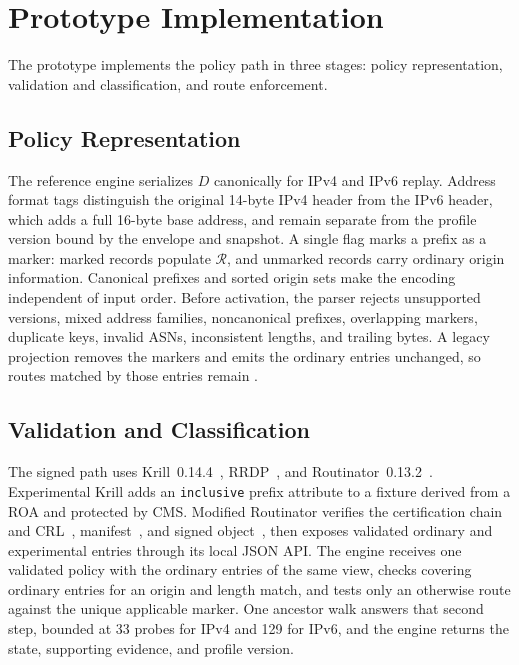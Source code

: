 \section{Prototype Implementation}
\label{sec:implementation}

The prototype implements the policy path in three stages: policy representation, validation and classification, and route enforcement.

\subsection{Policy Representation}
\label{sec:impl-representation}

The reference engine serializes $D$ canonically for IPv4 and IPv6 replay. Address format tags distinguish the original 14-byte IPv4 header from the IPv6 header, which adds a full 16-byte base address, and remain separate from the profile version bound by the envelope and snapshot. A single flag marks a prefix as a marker: marked records populate $\mathcal{R}$, and unmarked records carry ordinary origin information. Canonical prefixes and sorted origin sets make the encoding independent of input order. Before activation, the parser rejects unsupported versions, mixed address families, noncanonical prefixes, overlapping markers, duplicate keys, invalid ASNs, inconsistent lengths, and trailing bytes. A legacy projection removes the markers and emits the ordinary entries unchanged, so routes matched by those entries remain \explicit{}.

\subsection{Validation and Classification}
\label{sec:impl-engine}

The signed path uses Krill~0.14.4~\cite{krill}, RRDP~\cite{rfc8182}, and Routinator~0.13.2~\cite{routinator}. Experimental Krill adds an \texttt{inclusive} prefix attribute to a fixture derived from a ROA and protected by CMS. Modified Routinator verifies the certification chain and CRL~\cite{rfc6487}, manifest~\cite{rfc9286}, and signed object~\cite{rfc6488}, then exposes validated ordinary and experimental entries through its local JSON API. The engine receives one validated policy with the ordinary entries of the same view, checks covering ordinary entries for an origin and length match, and tests only an otherwise \invalid{} route against the unique applicable marker. One ancestor walk answers that second step, bounded at 33 probes for IPv4 and 129 for IPv6, and the engine returns the state, supporting evidence, and profile version.

